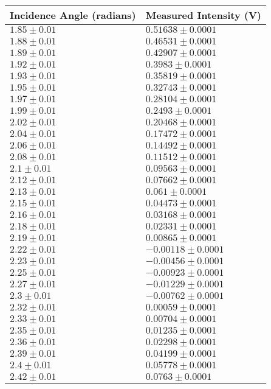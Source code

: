 \begin{tabular}{| p{} | p{} |}
\hline
Incidence Angle (radians) & Measured Intensity (V)\\
\hline
$1.85 \pm 0.01$ & $0.51638 \pm 0.0001$\\
$1.88 \pm 0.01$ & $0.46531 \pm 0.0001$\\
$1.89 \pm 0.01$ & $0.42907 \pm 0.0001$\\
$1.92 \pm 0.01$ & $0.3983 \pm 0.0001$\\
$1.93 \pm 0.01$ & $0.35819 \pm 0.0001$\\
$1.95 \pm 0.01$ & $0.32743 \pm 0.0001$\\
$1.97 \pm 0.01$ & $0.28104 \pm 0.0001$\\
$1.99 \pm 0.01$ & $0.2493 \pm 0.0001$\\
$2.02 \pm 0.01$ & $0.20468 \pm 0.0001$\\
$2.04 \pm 0.01$ & $0.17472 \pm 0.0001$\\
$2.06 \pm 0.01$ & $0.14492 \pm 0.0001$\\
$2.08 \pm 0.01$ & $0.11512 \pm 0.0001$\\
$2.1 \pm 0.01$ & $0.09563 \pm 0.0001$\\
$2.12 \pm 0.01$ & $0.07662 \pm 0.0001$\\
$2.13 \pm 0.01$ & $0.061 \pm 0.0001$\\
$2.15 \pm 0.01$ & $0.04473 \pm 0.0001$\\
$2.16 \pm 0.01$ & $0.03168 \pm 0.0001$\\
$2.18 \pm 0.01$ & $0.02331 \pm 0.0001$\\
$2.19 \pm 0.01$ & $0.00865 \pm 0.0001$\\
$2.22 \pm 0.01$ & $-0.00118 \pm 0.0001$\\
$2.23 \pm 0.01$ & $-0.00456 \pm 0.0001$\\
$2.25 \pm 0.01$ & $-0.00923 \pm 0.0001$\\
$2.27 \pm 0.01$ & $-0.01229 \pm 0.0001$\\
$2.3 \pm 0.01$ & $-0.00762 \pm 0.0001$\\
$2.32 \pm 0.01$ & $0.00059 \pm 0.0001$\\
$2.33 \pm 0.01$ & $0.00704 \pm 0.0001$\\
$2.35 \pm 0.01$ & $0.01235 \pm 0.0001$\\
$2.36 \pm 0.01$ & $0.02298 \pm 0.0001$\\
$2.39 \pm 0.01$ & $0.04199 \pm 0.0001$\\
$2.4 \pm 0.01$ & $0.05778 \pm 0.0001$\\
$2.42 \pm 0.01$ & $0.0763 \pm 0.0001$\\
\hline
\end{tabular}\hfill
